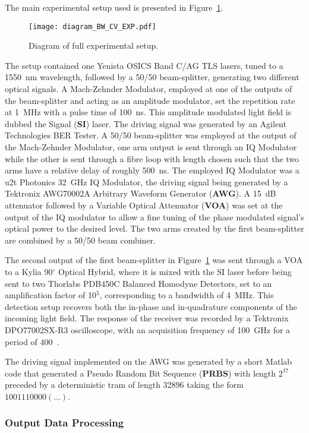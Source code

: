 The main experimental setup used is presented in Figure~\ref{fig:expDia}.
\begin{figure}[H]
\centering
\texttt{[image: diagram\_BW\_CV\_EXP.pdf]}
\caption{Diagram of full experimental setup.}
\label{fig:expDia}
\end{figure}
The setup contained one Yenista OSICS Band C/AG TLS lasers, tuned to a 1550~nm wavelength, followed by a 50/50 beam-splitter, generating two different optical signals. A Mach-Zehnder Modulator, employed at one of the outputs of the beam-splitter and acting as an amplitude modulator, set the repetition rate at 1~MHz with a pulse time of 100~ns. This amplitude modulated light field is dubbed the Signal (\textbf{SI}) laser. The driving signal was generated by an Agilent Technologies BER Tester. A 50/50 beam-splitter was employed at the output of the Mach-Zehnder Modulator, one arm output is sent through an IQ Modulator while the other is sent through a fibre loop with length chosen such that the two arms have a relative delay of roughly 500~ns. The employed IQ Modulator was a u2t Photonics 32~GHz IQ Modulator, the driving signal being generated by a Tektronix AWG70002A Arbitrary Waveform Generator (\textbf{AWG}). A 15~dB attenuator followed by a Variable Optical Attenuator (\textbf{VOA}) was set at the output of the IQ modulator to allow a fine tuning of the phase modulated signal's optical power to the desired level. The two arms created by the first beam-splitter are combined by a 50/50 beam combiner. 
\par
The second output of the first beam-splitter in Figure~\ref{fig:expDia} was sent through a VOA to a Kylia 90$^\circ$ Optical Hybrid, where it is mixed with the SI laser before being sent to two Thorlabs PDB450C Balanced Homodyne Detectors, set to an amplification factor of 10$^5$, corresponding to a bandwidth of 4~MHz. This detection setup recovers both the in-phase and in-quadrature components of the incoming light field. The response of the receiver was recorded by a Tektronix DPO77002SX-R3 oscilloscope, with an acquisition frequency of 100~GHz for a period of 400~.
\par
The driving signal implemented on the AWG was generated by a short Matlab code that generated a Pseudo Random Bit Sequence (\textbf{PRBS}) with length $2^{17}$ preceded by a deterministic tram of length 32896 taking the form $1001110000(...)$.

\subsubsection{Output Data Processing}

